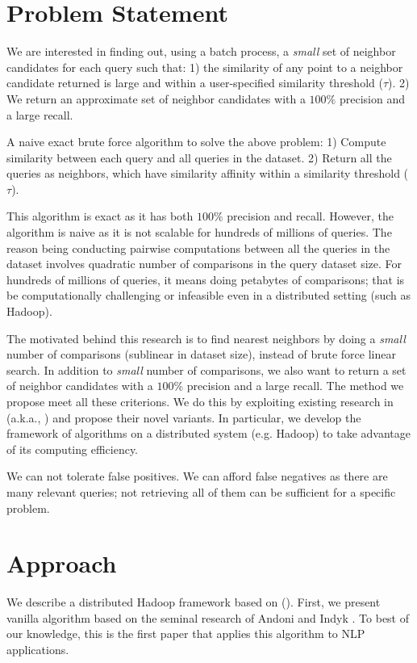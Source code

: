 
\section{Problem Statement}
We are interested in finding out, using a batch process, a \emph{small} set of
neighbor candidates for each query such that: 1) the similarity of any
point to a neighbor candidate returned is large and within a user-specified 
similarity threshold ($\tau$). 2) We return an approximate set of neighbor 
candidates with a $100\%$ precision and a large recall. 

A naive exact brute force algorithm to solve the above problem: 
1) Compute similarity between each query and all queries in the dataset. 
2) Return all the queries as neighbors, which have similarity affinity within a similarity threshold ($\tau$). 

This algorithm is exact as it has both $100\%$ precision and recall. 
However, the algorithm is naive as it is not scalable for hundreds of millions of queries. 
The reason being conducting pairwise computations between all the queries in the dataset involves 
quadratic number of comparisons in the query dataset size. 
For hundreds of millions of queries, it means doing petabytes of comparisons; 
that is be computationally challenging or infeasible even in a distributed setting (such as Hadoop).   

The motivated behind this research is to find nearest neighbors by doing a 
\emph{small} number of comparisons (sublinear in dataset size), instead of brute force linear search. 
In addition to \emph{small} number of comparisons, we also want to 
return a set of neighbor candidates with a $100\%$ precision and a large recall. 
The method we propose meet all these criterions. We do this by exploiting 
existing research in \lshf (a.k.a., \lsh) and propose their novel variants. 
In particular, we develop the framework of  \lsh algorithms on a distributed 
system (e.g. Hadoop) to take advantage of its computing efficiency.


We can not tolerate false positives. 
We can afford false negatives as there are many relevant queries; not retrieving all of them can be sufficient for a specific problem. 

\section{Approach}
\label{sec:approach}
We describe a distributed Hadoop framework based on \lshf (\lsh). 
First, we present vanilla \lsh algorithm based on the seminal research of Andoni and Indyk  . To best of our knowledge, this is the first paper that applies this algorithm to NLP applications. 

